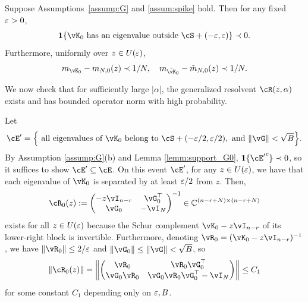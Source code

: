 \begin{lemma}\label{lemm:support_G0}
Suppose Assumptions~\ref{assump:G} and \ref{assum:spike} hold.
Then for any fixed $\varepsilon>0$,
\begin{align*}
\bI\{\vK_0 \text{ has an eigenvalue outside }
\cS+(-\eps,\eps)\} \prec 0.
\end{align*}
Furthermore, uniformly over $z \in U(\varepsilon)$,
\[m_{\vK_0}-m_{N,0}(z)\prec 1/N, \quad  m_{\tilde\vK_0}-\tilde m_{N,0}(z)
\prec 1/N.\]
\end{lemma}

We now check that for sufficiently large $|\alpha|$, the generalized resolvent
$\vcR(z,\alpha)$ exists and has bounded operator norm with high probability.\\

\begin{proof-of-lemma}
Let
\[\cE'=\left\{\text{ all eigenvalues of } \vK_0 \text{ belong to }
\cS+(-\eps/2,\eps/2),\text{ and }\norm{\vG}<\sqrt{B}\right\}.\]
By Assumption \ref{assump:G}(b) and Lemma \ref{lemm:support_G0},
$\bI\{{\cE'}^c\} \prec 0$, so it suffices to show $\cE' \subseteq \cE$. 
On this event $\cE'$, for any $z \in U(\varepsilon)$, we have that each
eigenvalue of $\vK_0$ is separated by at least $\varepsilon/2$ from $z$.
Then,
	\begin{equation}\label{eq:block_G0}
		\vcR_0(z):=\begin{pmatrix}
		-z\vI_{n-r} & \vG_0^{\top}\\
			\vG_0 & -\vI_N
		\end{pmatrix}^{-1} \in \C^{(n-r+N) \times (n-r+N)}
	\end{equation}
exists for all $z \in U(\varepsilon)$
because the Schur complement $\vK_0-z\vI_{n-r}$ of its lower-right block
is invertible.
Furthermore, denoting $\vR_0=(\vK_0-z\vI_{n-r})^{-1}$, we have
$\|\vR_0\| \leq 2/\eps$ and $\|\vG_0\| \leq \|\vG\|<\sqrt{B}$, so
	\begin{align}
\|\vcR_0(z)\|=\left\|\begin{pmatrix} \vR_0 & \vR_0\vG_0^\top
\\ \vG_0\vR_0 &
\vG_0\vR_0\vG_0^\top-\vI_N\end{pmatrix}\right\|
	\leq C_1\label{eq:R(z)_bound}
	\end{align}
for some constant $C_1$ depending only on $\varepsilon,B$.


\end{proof-of-lemma}
